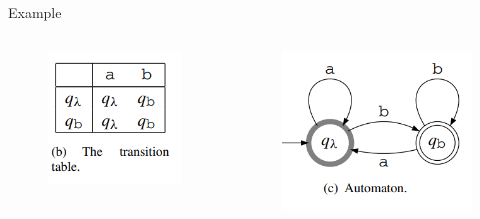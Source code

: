 \documentclass[aspectratio=169,xcolor=dvipsnames]{beamer}
\begin{document}
\begin{frame}[t]{Example}
\begin{columns}
    \begin{figure}
        \centering
        \includegraphics[width=1\linewidth]{images/fig13_3b.png}
    \end{figure}

    \begin{figure}
        \centering
        \includegraphics[width=1\linewidth]{images/fig13_3c.png}
    \end{figure}
\end{columns}

\end{frame}
\end{document}
